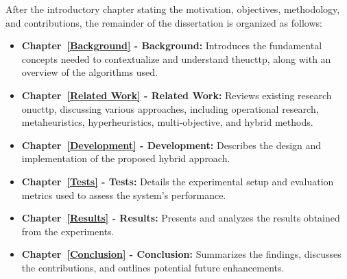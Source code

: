After the introductory chapter stating the motivation, objectives, methodology, and contributions, the remainder of the dissertation is organized as follows:

\begin{itemize}
\item \textbf{Chapter~\ref{Background} - Background:} Introduces the fundamental concepts needed to contextualize and understand the\ac{ucttp}, along with an overview of the algorithms used.
\item \textbf{Chapter~\ref{Related Work} -  Related Work:} Reviews existing research on\ac{ucttp}, discussing various approaches, including operational research, metaheuristics, hyperheuristics, multi-objective, and hybrid methods.
\item \textbf{Chapter~\ref{Development} -  Development:} Describes the design and implementation of the proposed hybrid approach.
\item \textbf{Chapter~\ref{Tests} - Tests:} Details the experimental setup and evaluation metrics used to assess the system's performance.
\item \textbf{Chapter~\ref{Results} -  Results:} Presents and analyzes the results obtained from the experiments. 
\item \textbf{Chapter~\ref{Conclusion} - Conclusion:} Summarizes the findings, discusses the contributions, and outlines potential future enhancements.
\end{itemize}

